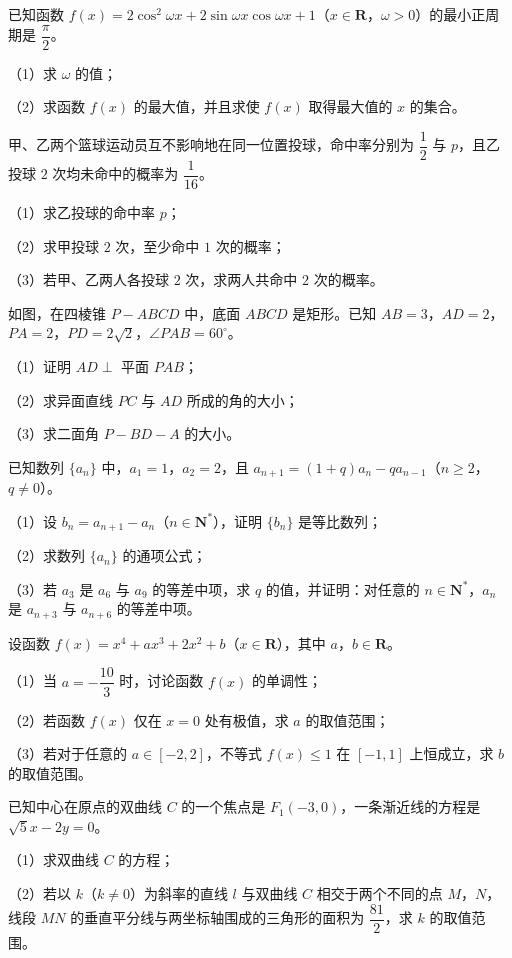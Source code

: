 \begin{question}
已知函数 $f(x)=2\cos^2\omega x+2\sin\omega x\cos\omega x+1$（$x\in\mathbf R$，$\omega>0$）的最小正周期是 $\dfrac{\pi}2$。

（1）求 $\omega$ 的值；

（2）求函数 $f(x)$ 的最大值，并且求使 $f(x)$ 取得最大值的 $x$ 的集合。

\end{question}
\begingroup
\renewenvironment{question}{\Needspace{0.46\textheight}}{}
\begin{question}
甲、乙两个篮球运动员互不影响地在同一位置投球，命中率分别为 $\dfrac12$ 与 $p$，且乙投球 $2$ 次均未命中的概率为 $\dfrac1{16}$。

（1）求乙投球的命中率 $p$；

（2）求甲投球 $2$ 次，至少命中 $1$ 次的概率；

（3）若甲、乙两人各投球 $2$ 次，求两人共命中 $2$ 次的概率。

\Needspace{0.4\textheight}
\end{question}
\endgroup
\begin{question}
如图，在四棱锥 $P-ABCD$ 中，底面 $ABCD$ 是矩形。已知 $AB=3$，$AD=2$，$PA=2$，$PD=2\sqrt2$，$\angle PAB=60^\circ$。

（1）证明 $AD\perp$ 平面 $PAB$；

（2）求异面直线 $PC$ 与 $AD$ 所成的角的大小；

（3）求二面角 $P-BD-A$ 的大小。
\nopagebreak[4]
\begin{center}\end{center}
\nopagebreak[4]
\end{question}
\begin{question}
已知数列 $\{a_n\}$ 中，$a_1=1$，$a_2=2$，且 $a_{n+1}=(1+q)a_n-qa_{n-1}$（$n\geqslant2$，$q\neq0$）。

（1）设 $b_n=a_{n+1}-a_n$（$n\in\mathbf N^*$），证明 $\{b_n\}$ 是等比数列；

（2）求数列 $\{a_n\}$ 的通项公式；

（3）若 $a_3$ 是 $a_6$ 与 $a_9$ 的等差中项，求 $q$ 的值，并证明：对任意的 $n\in\mathbf N^*$，$a_n$ 是 $a_{n+3}$ 与 $a_{n+6}$ 的等差中项。

\end{question}
\begin{question}
设函数 $f(x)=x^4+ax^3+2x^2+b$（$x\in\mathbf R$），其中 $a$，$b\in\mathbf R$。

（1）当 $a=-\dfrac{10}3$ 时，讨论函数 $f(x)$ 的单调性；

（2）若函数 $f(x)$ 仅在 $x=0$ 处有极值，求 $a$ 的取值范围；

（3）若对于任意的 $a\in[-2,2]$，不等式 $f(x)\leqslant1$ 在 $[-1,1]$ 上恒成立，求 $b$ 的取值范围。

\end{question}
\begin{question}
已知中心在原点的双曲线 $C$ 的一个焦点是 $F_1(-3,0)$，一条渐近线的方程是 $\sqrt5x-2y=0$。

（1）求双曲线 $C$ 的方程；

（2）若以 $k$（$k\neq0$）为斜率的直线 $l$ 与双曲线 $C$ 相交于两个不同的点 $M$，$N$，线段 $MN$ 的垂直平分线与两坐标轴围成的三角形的面积为 $\dfrac{81}2$，求 $k$ 的取值范围。

\end{question}